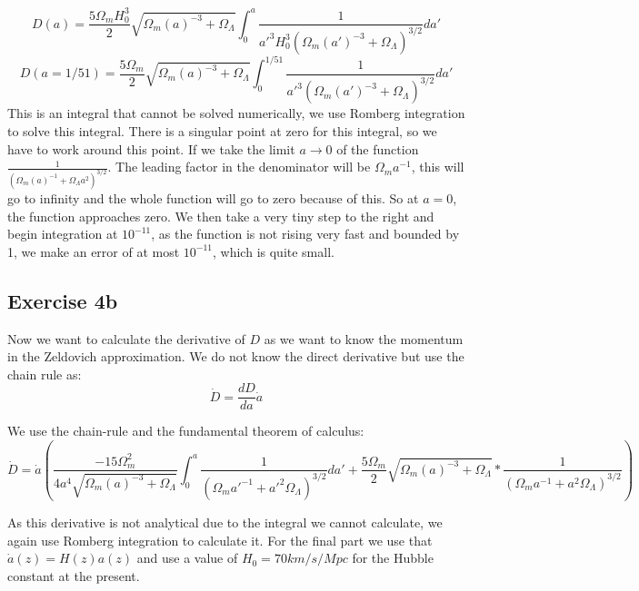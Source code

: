\begin{equation}
    D(a)=\frac{5\Omega_m H_0^3}{2}\sqrt{\Omega_m(a)^{-3}+\Omega_{\Lambda}}\displaystyle\int_{0}^{a}{\frac{1}{a'^3H_0^3\left(\Omega_m(a')^{-3}+\Omega_{\Lambda}\right)^{3/2}}da'}
\end{equation}
\begin{equation}
    D(a=1/51)=\frac{5\Omega_m}{2}\sqrt{\Omega_m(a)^{-3}+\Omega_{\Lambda}}\displaystyle\int_{0}^{1/51}{\frac{1}{a'^3\left(\Omega_m(a')^{-3}+\Omega_{\Lambda}\right)^{3/2}}da'}
\end{equation}
This is an integral that cannot be solved numerically, we use Romberg integration to solve this integral. There is a singular point at zero for this integral, so we have to work around this point. If we take the limit $a\rightarrow 0$ of the function $\frac{1}{\left(\Omega_m(a)^{-1}+\Omega_{\Lambda}a^2\right)^{3/2}}$. The leading factor in the denominator will be $\Omega_m a^{-1}$, this will go to infinity and the whole function will go to zero because of this. So at $a=0$, the function approaches zero. We then take a very tiny step to the right and begin integration at $10^{-11}$, as the function is not rising very fast and bounded by 1, we make an error of at most $10^{-11}$, which is quite small.




\subsection{Exercise 4b}
Now we want to calculate the derivative of $D$ as we want to know the momentum in the Zeldovich approximation. We do not know the direct derivative but use the chain rule as:
\begin{equation}
    \dot{D}=\frac{dD}{da}\dot{a}
\end{equation}

We use the chain-rule and the fundamental theorem of calculus:
\begin{equation}
    \dot{D}=\dot{a}\left(\frac{-15\Omega_m^2}{4a^4\sqrt{\Omega_m(a)^{-3}+\Omega_{\Lambda}}}\displaystyle\int_{0}^{a}{\frac{1}{\left(\Omega_ma'^{-1}+a'^2\Omega_{\Lambda}\right)^{3/2}}da'}+\frac{5\Omega_m}{2}\sqrt{\Omega_m(a)^{-3}+\Omega_{\Lambda}}*\frac{1}{\left(\Omega_ma^{-1}+a^2\Omega_{\Lambda}\right)^{3/2}}   \right)
\end{equation}

As this derivative is not analytical due to the integral we cannot calculate, we again use Romberg integration to calculate it. For the final part we use that $\dot{a}(z)=H(z)a(z)$ and use a value of $H_0=70km/s/Mpc$ for the Hubble constant at the present.

